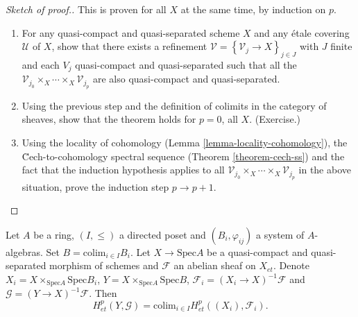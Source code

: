 \begin{proof}[Sketch of proof.]
This is proven for all $X$ at the same time, by induction on $p$.
\begin{enumerate}
\item
For any quasi-compact and quasi-separated scheme $X$ and any \'etale covering
$\mathcal{U}$ of $X$, show that there exists a refinement $\mathcal{V}
=\left\{\mathcal{V}_j \to X\right\}_{j\in J}$ with $J$ finite and each $V_j$
quasi-compact and quasi-separated such that all the $\mathcal{V}_{j_0} \times_X
\cdots \times_X \mathcal{V}_{j_p}$ are also quasi-compact and quasi-separated.
\item
Using the previous step and the definition of colimits in the category of
sheaves, show that the theorem holds for $p=0$, all $X$. (Exercise.)
\item
Using the locality of cohomology
(Lemma \ref{lemma-locality-cohomology}),
the \u Cech-to-cohomology spectral sequence
(Theorem \ref{theorem-cech-ss}) and the fact that the induction
hypothesis applies to all $\mathcal{V}_{j_0}\times_X \cdots \times_X
\mathcal{V}_{j_p}$ in the above situation, prove the induction step $p\to p+1$.
\end{enumerate}
\end{proof}

\begin{theorem}
\label{theorem-directed-colimit-cohomology}
Let $A$ be a ring, $(I, \leq)$ a directed poset and $(B_i, \varphi_{ij})$ a
system of $A$-algebras. Set $B=\text{colim}_{i\in I} B_i$. Let $X \to
\text{Spec} A$ be a quasi-compact and quasi-separated morphism of schemes and
$\mathcal{F}$ an abelian sheaf on $X_{et}$. Denote $X_i = X\times_{\text{Spec}
A} \text{Spec} B_i$, $Y= X \times_{\text{Spec} A}\text{Spec} B$,
$\mathcal{F}_i = (X_i\to X)^{-1}\mathcal{F}$ and $\mathcal{G} = (Y\to
X)^{-1}\mathcal{F}$. Then
$$
H_{et}^p(Y, \mathcal{G}) = \text{colim}_{i\in I} H_{et}^p ((X_i),
\mathcal{F}_i).
$$
\end{theorem}

